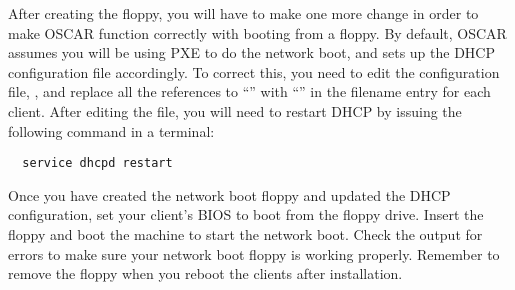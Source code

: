 After creating the floppy, you will have to make one more change in
order to make OSCAR function correctly with booting from a floppy. By
default, OSCAR assumes you will be using PXE to do the network boot,
and sets up the DHCP configuration file accordingly. To correct this,
you need to edit the configuration file, , and
replace all the references to ``'' with
``'' in the filename entry for each client. After
editing the file, you will need to restart DHCP by issuing the
following command in a terminal: 

\begin{verbatim}
  service dhcpd restart
\end{verbatim}

Once you have created the network boot floppy and updated the DHCP
configuration, set your client's BIOS to boot from the floppy
drive. Insert the floppy and boot the machine to start the network
boot. Check the output for errors to make sure your network boot
floppy is working properly. Remember to remove the floppy when you
reboot the clients after installation.


